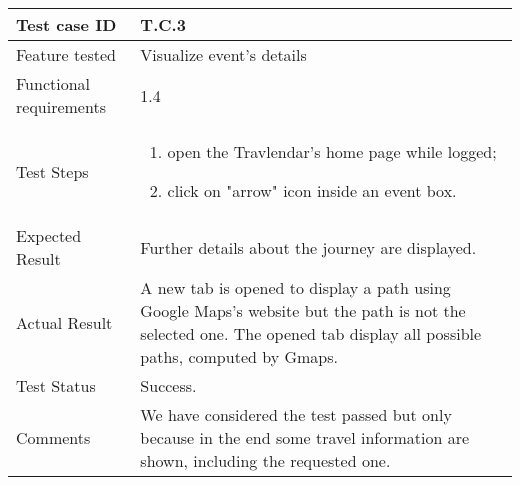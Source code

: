 \begin{table}[H]
	\begin{center}
		\begin{tabular}{ | p{} | p{} | }
		\hline
		Test case ID & T.C.3\\
		\hline
		Feature tested & Visualize event's details  \\
		\hline
		Functional requirements & 1.4  \\
		\hline
		Test Steps & 
			\begin{enumerate}
				\item open the Travlendar's home page while logged;
				\item click on "arrow" icon inside an event box.
			\end{enumerate} \\
		\hline
		Expected Result & Further details about the journey are displayed.\\
		\hline
		Actual Result & A new tab is opened to display a path using Google Maps's website but the path is not the selected one. The opened tab display all possible paths, computed by Gmaps.  \\ 
		\hline
		Test Status & \color{ForestGreen}Success.\\ 
		\hline
		Comments & We have considered the test passed but only because in the end some travel information are shown, including the requested one.\\ 
		\hline
		\end{tabular}
	\end{center}
\end{table}

